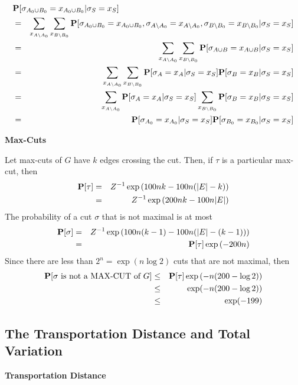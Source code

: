 \documentclass[11pt]{article} \usepackage{amssymb}
\begin{document}
\begin{eqnarray*}
\lefteqn{\P[\sigma_{A_0\cup B_0}=x_{A_0\cup B_0}|\sigma_S=x_S]}
\\ &=& 
\sum_{x_{A\setminus A_0}}\sum_{x_{B\setminus B_0}}\P[\sigma_{A_0\cup B_0}=x_{A_0\cup B_0},\sigma_{A\setminus A_0}=x_{A\setminus A_0},\sigma_{B\setminus B_0}=x_{B\setminus B_0}|\sigma_S=x_S]
\\ &=& \sum_{x_{A\setminus A_0}}\sum_{x_{B\setminus B_0}}\P[\sigma_{A\cup B}=x_{A\cup B}|\sigma_S=x_S]
\\ &=& \sum_{x_{A\setminus A_0}}\sum_{x_{B\setminus B_0}}\P[\sigma_A=x_A|\sigma_S=x_S]\P[\sigma_B=x_B|\sigma_S=x_S]
\\ &=& \sum_{x_{A\setminus A_0}}\P[\sigma_A=x_A|\sigma_S=x_S]\sum_{x_{B\setminus B_0}}\P[\sigma_B=x_B|\sigma_S=x_S]
\\ &=& \P[\sigma_{A_0}=x_{A_0}|\sigma_S=x_S]\P[\sigma_{B_0}=x_{B_0}|\sigma_S=x_S]
\end{eqnarray*}


{\bf Max-Cuts}

Let max-cuts of $G$ have $k$ edges crossing the cut. Then, if $\tau$ is a particular
max-cut, then
\begin{eqnarray*}
  \P[\tau]&=&Z^{-1}\exp\left(100nk-100n(|E|-k)\right)
  \\ &=& Z^{-1}\exp\left(200nk-100n|E|\right)
\end{eqnarray*}
The probability of a cut $\sigma$ that is not maximal is at most
\begin{eqnarray*}
  \P[\sigma]&=&Z^{-1}\exp\left(100n(k-1)-100n(|E|-(k-1))\right)
  \\ &=& \P[\tau]\exp\left(-200n\right)
\end{eqnarray*}
Since there are less than $2^n=\exp(n\log 2)$ cuts that are not maximal, then
\begin{eqnarray*}
  \P[\sigma\mbox{ is not a MAX-CUT of $G$}] &\leq& \P[\tau]\exp\left(-n(200-\log 2)\right)
\\ &\leq& \exp(-n(200-\log 2)) 
\\ &\leq& \exp(-199) 
\end{eqnarray*}

\subsection{The Transportation Distance and Total Variation}
{\bf Transportation Distance}
\end{document}
